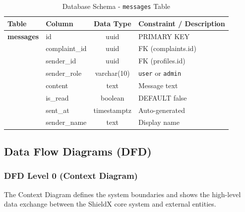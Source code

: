 \documentclass[12pt, a4paper, twoside]{report}
\begin{document}
\begin{table}[ht]
\centering
\caption{Database Schema - \texttt{messages} Table}
\label{tab:messages}
\begin{tabularx}{\textwidth}{p{3cm} p{3cm} c X}
\toprule
\textbf{Table} & \textbf{Column} & \textbf{Data Type} & \textbf{Constraint / Description} \\
\midrule
\textbf{messages} & id & uuid & PRIMARY KEY \\
& complaint\_id & uuid & FK (complaints.id) \\
& sender\_id & uuid & FK (profiles.id) \\
& sender\_role & varchar(10) & \texttt{user} or \texttt{admin} \\
& content & text & Message text \\
& is\_read & boolean & DEFAULT false \\
& sent\_at & timestamptz & Auto-generated \\
& sender\_name & text & Display name \\
\bottomrule
\end{tabularx}
\end{table}



\subsection{Data Flow Diagrams (DFD)}

\subsubsection{DFD Level 0 (Context Diagram)}
The Context Diagram defines the system boundaries and shows the high-level data exchange between the ShieldX core system and external entities.
\end{document}
